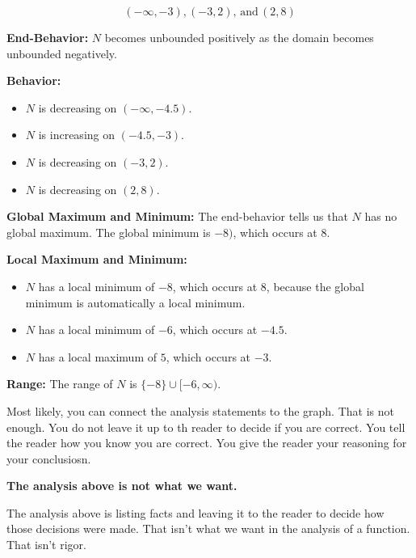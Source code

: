 \documentclass{ximera}
\begin{document}
\begin{example}
\[
(-\infty, -3), (-3, 2), \, \text{and} \, (2, 8)
\]


\textbf{End-Behavior:}  $N$ becomes unbounded positively as the domain becomes unbounded negatively.


\textbf{Behavior:}  

\begin{itemize}
	\item $N$ is decreasing on $(-\infty, -4.5)$.
	\item $N$ is increasing on $(-4.5, -3)$.
	\item $N$ is decreasing on $(-3, 2)$.
	\item $N$ is decreasing on $(2, 8)$.
\end{itemize}



\textbf{Global Maximum and Minimum:} The end-behavior tells us that $N$ has no global maximum.  The global minimum is $-8)$, which occurs at $8$.  


\textbf{Local Maximum and Minimum:} 

\begin{itemize}
	\item $N$ has a local minimum of $-8$, which occurs at $8$, because the global minimum is automatically a local minimum.
	\item $N$ has a local minimum of $-6$, which occurs at $-4.5$.
	\item $N$ has a local maximum of $5$, which occurs at $-3$.

\end{itemize}

\textbf{Range:} The range of $N$ is $\{ -8 \} \cup [-6, \infty)$. 


\end{example}


Most likely, you can connect the analysis statements to the graph. That is not enough. You do not leave it up to th reader to decide if you are correct. You tell the reader how you know you are correct.  You give the reader your reasoning for your conclusiosn.

\begin{center}
\textbf{\textcolor{red!70!black}{The analysis above is not what we want.}}  
\end{center}


The analysis above is listing facts and leaving it to the reader to decide how those decisions were made.  That isn't what we want in the analysis of a function. That isn't rigor. 
\end{document}
